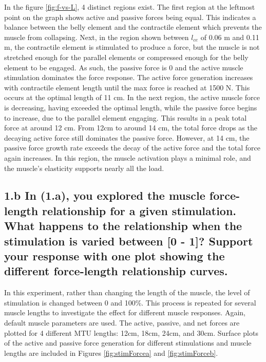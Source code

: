 \documentclass{cmc}
\begin{document}
In the figure \ref{fig:f-vs-L}, 4 distinct regions exist. The first region at the leftmost point on the graph shows active and passive forces being equal. This indicates a balance between the belly element and the contractile element which prevents the muscle from collapsing. Next, in the region shown between $l_{ce}$ of 0.06 m and 0.11 m, the contractile element is stimulated to produce a force, but the muscle is not stretched enough for the parallel elements or compressed enough for the belly element to be engaged. As such, the passive force is 0 and the active muscle stimulation dominates the force response. The active force generation increases with contractile element length until the max force is reached at 1500 N. This occurs at the optimal length of 11 cm. In the next region, the active muscle force is decreasing, having exceeded the optimal length, while the passive force begins to increase, due to the parallel element engaging. This results in a peak total force at around 12 cm. From 12cm to around 14 cm, the total force drops as the decaying active force still dominates the passive force. However, at 14 cm, the passive force growth rate exceeds the decay of the active force and the total force again increases. In this region, the muscle activation plays a minimal role, and the muscle's elasticity supports nearly all the load. 

\subsection*{1.b In (1.a), you explored the muscle force-length
  relationship for a given stimulation. What happens to the
  relationship when the stimulation is varied between [0 - 1]? Support
  your response with one plot showing the different force-length
  relationship curves.}

In this experiment, rather than changing the length of the muscle, the level of stimulation is changed between 0 and 100\%. This process is repeated for several muscle lengths to investigate the effect for different muscle responses. Again, default muscle parameters are used. The active, passive, and net forces are plotted for 4 different MTU lengths: 12cm, 18cm, 24cm, and 30cm. Surface plots of the active and passive force generation for different stimulations and muscle lengths are included in Figures \ref{fig:stimForcea} and \ref{fig:stimForceb}.
\end{document}
